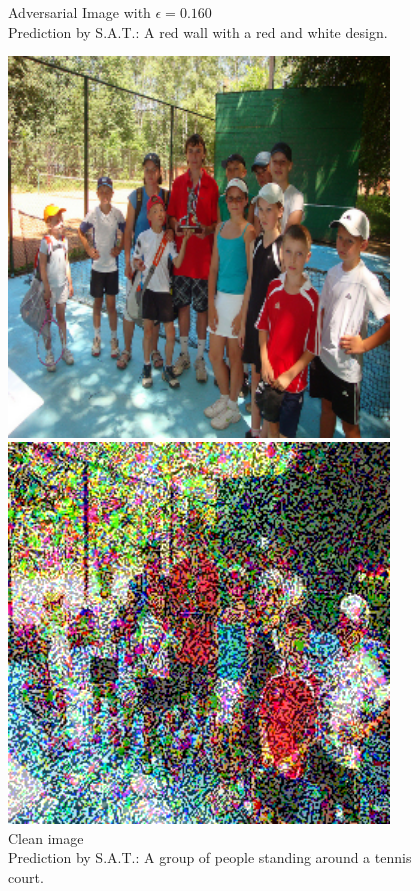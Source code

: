 \begin{figure}[ht]
\begin{minipage}{0.45\textwidth}
        \caption*{Adversarial Image with $\epsilon=0.160$\\Prediction by S.A.T.: A red wall with a red and white design.}
    \end{minipage}
\end{figure}

\begin{figure}[ht]
    \centering
    \begin{minipage}{0.45\textwidth}
        \centering
        \includegraphics[width=0.9\textwidth]{figures/fast_method_group_of_people/group_of_people_0.000.png} %
        \caption*{Clean image\\Prediction by S.A.T.: A group of people standing around a tennis court.}
    \end{minipage}\hfill
    \begin{minipage}{0.45\textwidth}
        \centering
        \includegraphics[width=0.9\textwidth]{figures/fast_method_group_of_people/group_of_people_0.320.png} %

\end{minipage}
\end{figure}

